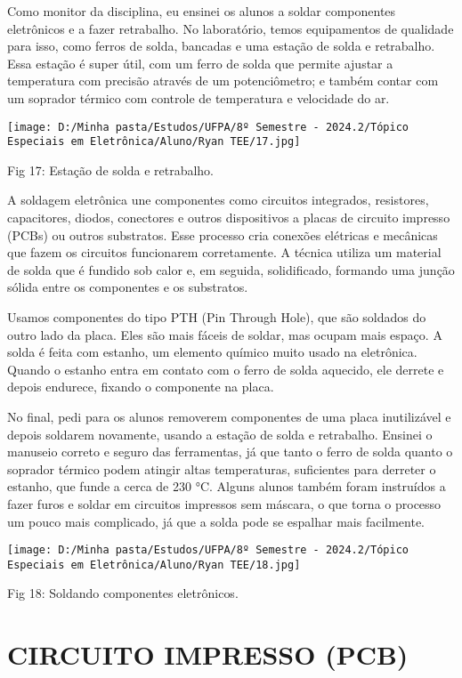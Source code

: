 \documentclass[
]{book}
\begin{document}
Como monitor da disciplina, eu ensinei os alunos a soldar componentes eletrônicos e a fazer retrabalho. No laboratório, temos equipamentos de qualidade para isso, como ferros de solda, bancadas e uma estação de solda e retrabalho. Essa estação é super útil, com um ferro de solda que permite ajustar a temperatura com precisão através de um potenciômetro; e também contar com um soprador térmico com controle de temperatura e velocidade do ar.

\texttt{[image: D:/Minha pasta/Estudos/UFPA/8º Semestre - 2024.2/Tópico Especiais em Eletrônica/Aluno/Ryan TEE/17.jpg]}

Fig 17: Estação de solda e retrabalho.

A soldagem eletrônica une componentes como circuitos integrados, resistores, capacitores, diodos, conectores e outros dispositivos a placas de circuito impresso (PCBs) ou outros substratos. Esse processo cria conexões elétricas e mecânicas que fazem os circuitos funcionarem corretamente. A técnica utiliza um material de solda que é fundido sob calor e, em seguida, solidificado, formando uma junção sólida entre os componentes e os substratos.

Usamos componentes do tipo PTH (Pin Through Hole), que são soldados do outro lado da placa. Eles são mais fáceis de soldar, mas ocupam mais espaço. A solda é feita com estanho, um elemento químico muito usado na eletrônica. Quando o estanho entra em contato com o ferro de solda aquecido, ele derrete e depois endurece, fixando o componente na placa.

No final, pedi para os alunos removerem componentes de uma placa inutilizável e depois soldarem novamente, usando a estação de solda e retrabalho. Ensinei o manuseio correto e seguro das ferramentas, já que tanto o ferro de solda quanto o soprador térmico podem atingir altas temperaturas, suficientes para derreter o estanho, que funde a cerca de 230 °C. Alguns alunos também foram instruídos a fazer furos e soldar em circuitos impressos sem máscara, o que torna o processo um pouco mais complicado, já que a solda pode se espalhar mais facilmente.

\texttt{[image: D:/Minha pasta/Estudos/UFPA/8º Semestre - 2024.2/Tópico Especiais em Eletrônica/Aluno/Ryan TEE/18.jpg]}

Fig 18: Soldando componentes eletrônicos.

\chapter{CIRCUITO IMPRESSO (PCB)}\label{circuito-impresso-pcb}
\end{document}
